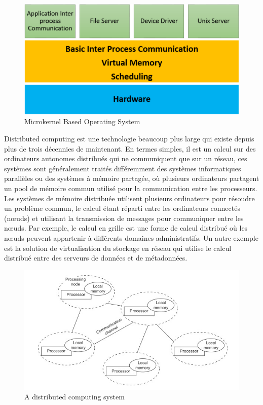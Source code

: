 \documentclass[a4paper, 12pt]{article}
\begin{document}
   \begin{figure}[h]
\centering
\includegraphics[scale=0.5]{image2.PNG}
\caption{Microkernel Based Operating System}
\end{figure}
\newline
Distributed computing est une technologie beaucoup plus large qui existe depuis plus de trois décennies de maintenant. En termes simples, il est un calcul sur des ordinateurs autonomes distribués qui ne communiquent que sur un réseau, ces systèmes sont généralement traités différemment des systèmes informatiques parallèles ou des systèmes à mémoire partagée, où plusieurs ordinateurs partagent un pool de mémoire commun utilisé pour la communication entre les processeurs. Les systèmes de mémoire distribuée utilisent plusieurs ordinateurs pour résoudre un problème commun, le calcul étant réparti entre les ordinateurs connectés (nœuds) et utilisant la transmission de messages pour communiquer entre les nœuds. Par exemple, le calcul en grille est une forme de calcul distribué où les nœuds peuvent appartenir à différents domaines administratifs. Un autre exemple est la solution de virtualisation du stockage en réseau qui utilise le calcul distribué entre des serveurs de données et de métadonnées.
   \begin{figure}[h]
\centering
\includegraphics[scale=0.5]{image3.PNG}
\caption{A distributed computing system}
\end{figure}
\newline
\end{document}
